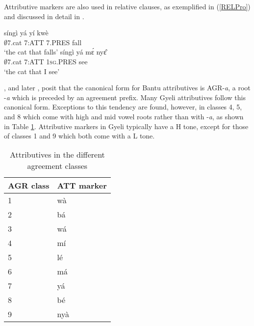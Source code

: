 Attributive markers are also used in relative clauses, as exemplified in (\ref{RELPro}) and discussed in detail in .

\begin{exe}
\ex\label{RELPro}
\begin{xlist}
\ex \label{RELPro1}
  \gll     síngì yá yí kwè \\
                $\emptyset$7.cat 7:ATT 7.PRES fall \\
    \trans `the cat that falls'
\ex\label{RELPro2}
 \gll     síngì yá mɛ́ nyɛ̂ \\
                $\emptyset$7.cat 7:ATT 1\textsc{sg}.PRES see \\
    \trans `the cat that I see'
\end {xlist}
\end {exe}

\citet{meeussen67}, and later \citet[219]{velde2013}, posit that the canonical form for Bantu attributives is AGR-{\itshape a}, a root -{\itshape a} which is preceded by an agreement prefix. Many Gyeli attributives follow this canonical form. Exceptions to this tendency are found, however, in classes 4, 5, and 8 which come with high and mid vowel roots rather than with -{\itshape a}, as shown in Table \ref{Tab:AGRCON}.  Attributive markers in Gyeli typically have a H tone, except for those of classes 1 and 9 which both come with a L tone. 

\begin{table} 
\centering
\begin{tabular}{ll}
 \midrule
AGR class & ATT marker \\
  \midrule
 1 & wà  \\
 2 & bá \\
 3 & wá \\
4 & mí \\
5 & lé \\
6 & má \\
7 & yá \\
8 & bé \\
9 & nyà \\
  \midrule
\end{tabular}
\caption{Attributives in the different agreement classes}
\label{Tab:AGRCON}
\end{table}














